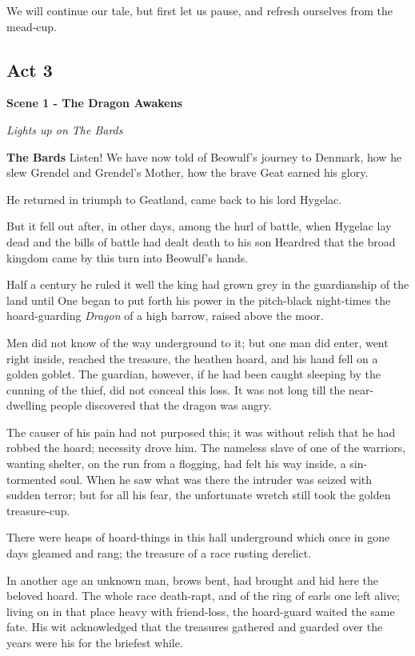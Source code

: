 \documentclass[a4paper]{article}
\begin{document}
{We will continue our tale,
but first let us pause,
and refresh ourselves from the mead-cup. 

\newpage
\subsection{Act 3}%

\centerline{\textbf{Scene 1 - The Dragon Awakens}}
\centerline{\textit{Lights up on The Bards}}

\textbf{The Bards}  Listen!
We have now told of Beowulf's journey to Denmark,
how he slew Grendel and Grendel's Mother,
how the brave Geat earned his glory.

He returned in triumph to Geatland,
came back to his lord Hygelac.

But it fell out after, in other days,
among the hurl of battle, when Hygelac lay dead
and the bills of battle had dealt death to his son Heardred
that the broad kingdom came by this turn
into Beowulf's hands.

Half a century he ruled it well
the king had grown grey in the guardianship of the land 
until One began to put forth his power in the pitch-black night-times
the hoard-guarding \textit{Dragon} of a high barrow, raised above the moor.

Men did not know
of the way underground to it; but one man did enter,
went right inside, reached the treasure,
the heathen hoard, and his hand fell
on a golden goblet. The guardian, however,
if he had been caught sleeping by the cunning of the thief,
did not conceal this loss. It was not long till the near-
dwelling people discovered that the dragon was angry.

The causer of his pain had not purposed this;
it was without relish that he had robbed the hoard;
necessity drove him. The nameless slave
of one of the warriors, wanting shelter,
on the run from a flogging, had felt his way inside,
a sin-tormented soul. When he saw what was there
the intruder was seized with sudden terror;
but for all his fear, the unfortunate wretch
still took the golden treasure-cup.

\newpage
There were heaps of hoard-things in this hall underground
which once in gone days gleamed and rang;
the treasure of a race rusting derelict.

In another age an unknown man,
brows bent, had brought and hid here
the beloved hoard. The whole race
death-rapt, and of the ring of earls
one left alive; living on in that place
heavy with friend-loss, the hoard-guard
waited the same fate. His wit acknowledged
that the treasures gathered and guarded over the years
were his for the briefest while.

}
\end{document}
